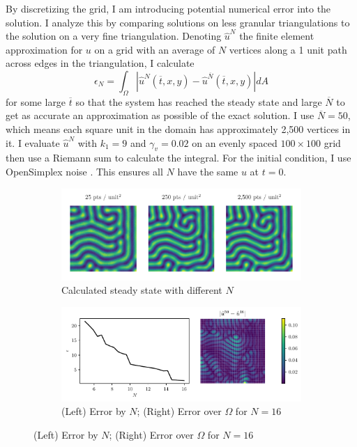 By discretizing the grid, I am introducing potential numerical error into the solution. I analyze this by comparing solutions on less granular triangulations to the solution on a very fine triangulation. Denoting $\hat{u}^{N}$ the finite element approximation for $u$ on a grid with an average of $N$ vertices along a 1 unit path across edges in the triangulation, I calculate
\[
    \epsilon_N = \int_\Omega \left| \hat{u}^N (\overline{t}, x, y) - \hat{u}^{\overline{N}} (\overline{t}, x, y) \right| dA
\]
for some large $\overline{t}$ so that the system has reached the steady state and large $\overline{N}$ to get as accurate an approximation as possible of the exact solution. I use $\overline{N} = 50$, which means each square unit in the domain has approximately 2,500 vertices in it. I evaluate $\hat{u}^N$ with $k_1 = 9$ and $\gamma_v = 0.02$ on an evenly spaced $100 \times 100$ grid then use a Riemann sum to calculate the integral. For the initial condition, I use OpenSimplex noise \autocite{thorimbert2016polynomial}. This ensures all $N$ have the same $u$ at $t = 0$.

\begin{figure}[t!]
    \centering
    \caption{Numerical error in the solutions on a $10 \times 10$ square domain}

    \begin{subfigure}{\textwidth}
        \centering
        \includegraphics{figures/error.pdf}
        \caption{Calculated steady state with different $N$}
        \label{subfig:res-by-N}
    \end{subfigure}

    \begin{subfigure}{\textwidth}
        \centering
        \includegraphics{figures/err_ovr_N.pdf}
        \caption{(Left) Error by $N$; (Right) Error over $\Omega$ for $N = 16$}
        \label{subfig:err-over-N}
    \end{subfigure}

    \label{fig:err}
\end{figure}

